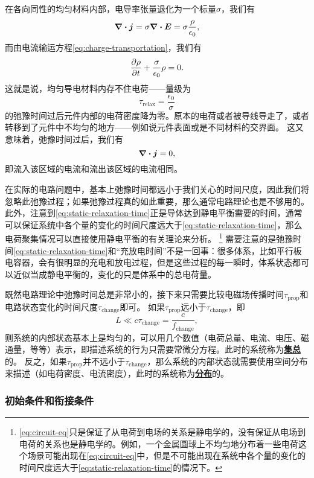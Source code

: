 \documentclass[UTF8, a4paper]{ctexart}
\newcommand*{\concept}[1]{\underline{\textbf{#1}}}
\begin{document}
在各向同性的均匀材料内部，电导率张量退化为一个标量$\sigma$，我们有
\[
    \div{\vb*{j}} = \sigma \div{\vb*{E}} = \sigma \frac{\rho}{\epsilon_0},
\]
而由电流输运方程\eqref{eq:charge-transportation}，我们有
\[
    \pdv{\rho}{t} + \frac{\sigma}{\epsilon_0} \rho = 0.
\]
这就是说，均匀导电材料内存不住电荷——量级为
\begin{equation}
    \tau_\text{relax} = \frac{\epsilon_0}{\sigma}
    \label{eq:static-relaxation-time}
\end{equation}
的弛豫时间过后元件内部的电荷密度降为零。原本的电荷或者被导线导走了，或者转移到了元件中不均匀的地方——例如说元件表面或是不同材料的交界面。
这又意味着，弛豫时间过后，我们有
\[
    \div{\vb*{j}} = 0,
\]
即流入该区域的电流和流出该区域的电流相同。

在实际的电路问题中，基本上弛豫时间都远小于我们关心的时间尺度，因此我们将忽略此弛豫过程；如果弛豫过程真的如此重要，那么通常电路理论也是不够用的。
此外，注意到\eqref{eq:static-relaxation-time}正是导体达到静电平衡需要的时间，通常可以保证系统中各个量的变化的时间尺度远大于\eqref{eq:static-relaxation-time}，那么电荷聚集情况可以直接使用静电平衡的有关理论来分析。%
\footnote{\eqref{eq:circuit-eq}只是保证了从电荷到电场的关系是静电学的，没有保证从电场到电荷的关系也是静电学的。例如，一个金属圆球上不均匀地分布着一些电荷这个场景可能出现在\eqref{eq:circuit-eq}中，但是不可能出现在系统中各个量的变化的时间尺度远大于\eqref{eq:static-relaxation-time}的情况下。}%
需要注意的是弛豫时间\eqref{eq:static-relaxation-time}和“充放电时间”不是一回事：很多体系，比如平行板电容器，会有很明显的充电和放电过程，但是这些过程的每一瞬时，体系状态都可以近似当成静电平衡的，变化的只是体系中的总电荷量。

既然电路理论中弛豫时间总是非常小的，接下来只需要比较电磁场传播时间$\tau_\text{prop}$和电路状态变化的时间尺度$\tau_\text{change}$即可。
如果$\tau_\text{prop}$远小于$\tau_\text{change}$，即
\begin{equation}
    L \ll c \tau_\text{change} = \frac{c}{f_\text{change}},
\end{equation}
则系统的内部状态基本上是均匀的，可以用几个数值（电荷总量、电流、电压、磁通量，等等）表示，即描述系统的行为只需要常微分方程。此时的系统称为\concept{集总}的。
反之，如果$\tau_\text{prop}$并不远小于$\tau_\text{change}$，那么系统的内部状态就需要使用空间分布来描述（如电荷密度、电流密度），此时的系统称为\concept{分布}的。

\subsubsection{初始条件和衔接条件}
\end{document}
